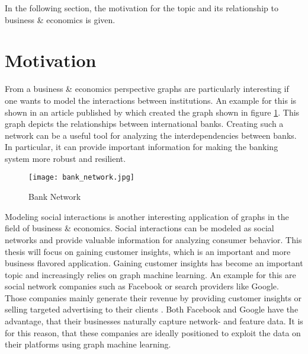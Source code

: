 	\noindent In the following section, the motivation for the topic and its
	relationship to business \& economics is given. 

	\section{Motivation}

	\noindent From a business \& economics perspective graphs are particularly
	interesting if one wants to model the interactions between institutions. An 
	example for this is shown in an article published by 
	\cite{schweitzer2009economic} which created the graph shown in figure
	\ref{fig:bank_network}. This graph depicts the relationships between 
	international banks. Creating such a network can be a useful tool for 
	analyzing the interdependencies between banks. In particular, it can 
	provide important information for making the banking system more robust and 
	resilient. 

	\begin{figure}[h]
		\centering
		\texttt{[image: bank\_network.jpg]}
		\caption{Bank Network}
		\cite[p. 424]{schweitzer2009economic}
		\label{fig:bank_network}
	\end{figure} 

	\noindent Modeling social interactions is another interesting application
	of graphs in the field of business \& economics. Social interactions can be
	modeled as social networks and provide valuable information for analyzing
	consumer behavior. This thesis will focus on gaining customer insights,
	which is an important and more business flavored application. Gaining
	customer insights has become an important topic and increasingly relies on
	graph machine learning. An example for this are social network companies 
	such as Facebook or search providers like Google. Those companies mainly 
	generate their revenue by providing customer insights or selling targeted 
	advertising to their clients \citep{Facebook2021,Alphabet2021}. Both 
	Facebook and Google have the advantage, that their businesses naturally 
	capture network- and feature data. It is for this reason, that these
	companies are ideally positioned to exploit the data on their platforms
	using graph machine learning. \\

